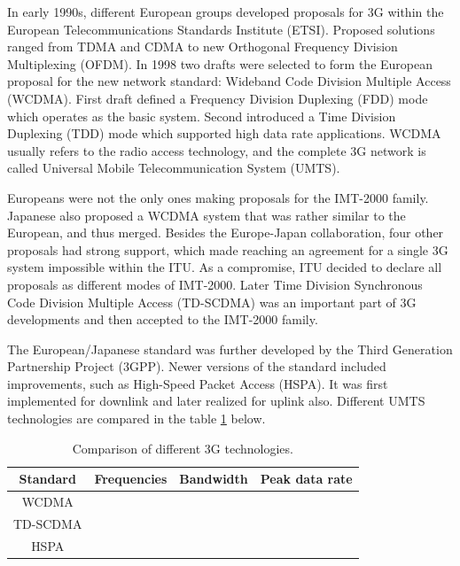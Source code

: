 In early 1990s, different European groups developed proposals for 3G within the European Telecommunications Standards Institute (ETSI). Proposed solutions ranged from TDMA and CDMA to new Orthogonal Frequency Division Multiplexing (OFDM). In 1998 two drafts were selected to form the European proposal for the new network standard: Wideband Code Division Multiple Access (WCDMA). First draft defined a Frequency Division Duplexing (FDD) mode which operates as the basic system. Second introduced a Time Division Duplexing (TDD) mode which supported high data rate applications. WCDMA usually refers to the radio access technology, and the complete 3G network is called Universal Mobile Telecommunication System (UMTS). \cite{molisch}

Europeans were not the only ones making proposals for the IMT-2000 family. Japanese also proposed a WCDMA system that was rather similar to the European, and thus merged. Besides the Europe-Japan collaboration, four other proposals had strong support, which made reaching an agreement for a single 3G system impossible within the ITU. As a compromise, ITU decided to declare all proposals as different modes of IMT-2000. Later Time Division Synchronous Code Division Multiple Access (TD-SCDMA) was an important part of 3G developments and then accepted to the IMT-2000 family. \cite{molisch}

The European/Japanese standard was further developed by the Third Generation Partnership Project (3GPP). Newer versions of the standard included improvements, such as High-Speed Packet Access (HSPA). It was first implemented for downlink and later realized for uplink also. Different UMTS technologies are compared in the table \ref{tab:3g} below. \cite{molisch} %

\begin{table}[H]
    \centering
    \caption{Comparison of different 3G technologies.} %
    \label{tab:3g}
    \begin{tabular}{|c|c|c|c|}
         \hline
         Standard &  Frequencies & Bandwidth & Peak data rate\\
         \hline
         WCDMA & & &\\
         \hline
         TD-SCDMA & & &\\
         \hline
         HSPA & & &\\
         \hline
    \end{tabular}
\end{table}

